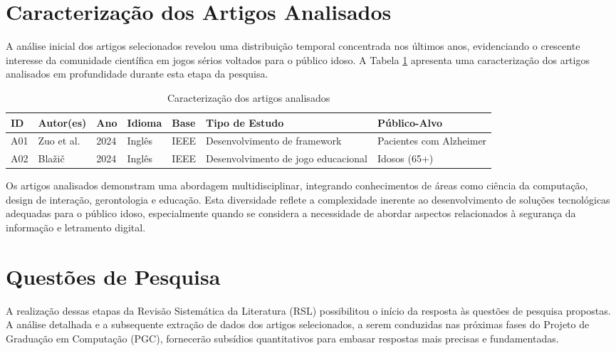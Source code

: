 \section{Caracterização dos Artigos Analisados}
\label{sec:caracterizacao}

A análise inicial dos artigos selecionados revelou uma distribuição temporal concentrada nos últimos anos, evidenciando o crescente interesse da comunidade científica em jogos sérios voltados para o público idoso. A Tabela \ref{tab:caracterizacao_artigos} apresenta uma caracterização dos artigos analisados em profundidade durante esta etapa da pesquisa.

\begin{table}[H]
\centering
\caption{Caracterização dos artigos analisados}
\label{tab:caracterizacao_artigos}
\begin{tabular}{p{1.5cm}p{3cm}p{1cm}p{1.5cm}p{1.5cm}p{3cm}p{2.5cm}}
\hline
\textbf{ID} & \textbf{Autor(es)} & \textbf{Ano} & \textbf{Idioma} & \textbf{Base} & \textbf{Tipo de Estudo} & \textbf{Público-Alvo} \\ \hline
A01 & Zuo et al. & 2024 & Inglês & IEEE & Desenvolvimento de framework & Pacientes com Alzheimer \\
A02 & Blažič & 2024 & Inglês & IEEE & Desenvolvimento de jogo educacional & Idosos (65+) \\
\hline
\end{tabular}
\end{table}

Os artigos analisados demonstram uma abordagem multidisciplinar, integrando conhecimentos de áreas como ciência da computação, design de interação, gerontologia e educação. Esta diversidade reflete a complexidade inerente ao desenvolvimento de soluções tecnológicas adequadas para o público idoso, especialmente quando se considera a necessidade de abordar aspectos relacionados à segurança da informação e letramento digital.

\section{Questões de Pesquisa}\label{sec:qp}

A realização dessas etapas da Revisão Sistemática da Literatura (RSL) possibilitou o início da resposta às questões de pesquisa propostas. A análise detalhada e a subsequente extração de dados dos artigos selecionados, a serem conduzidas nas próximas fases do Projeto de Graduação em Computação (PGC), fornecerão subsídios quantitativos para embasar respostas mais precisas e fundamentadas.

